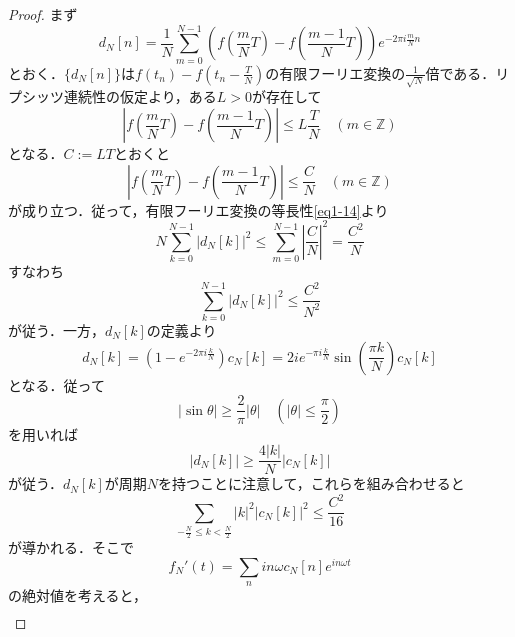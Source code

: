 \documentclass[a4j]{jsbook}
\numberwithin{theorem}{chapter}  %
\begin{document}
\begin{proof}
まず
\begin{equation*}
    d_N[n]=\frac{1}{N}\sum_{m=0}^{N-1}\left(f\left(\frac{m}{N}T\right)-f\left(\frac{m-1}{N}T\right)\right)e^{-2\pi i\frac{m}{N}n}
\end{equation*}
とおく．\(\{d_N[n]\}\)は\(\displaystyle f(t_n)-f\left(t_n-\frac{T}{N}\right)\)の有限フーリエ変換の\(\displaystyle\frac{1}{\sqrt{N}}\)倍である．リプシッツ連続性の仮定より，ある\(L>0\)が存在して
\begin{equation*}
    \left|f\left(\frac{m}{N}T\right)-f\left(\frac{m-1}{N}T\right)\right|\leq L\frac{T}{N}\quad (m\in\mathbb{Z})
\end{equation*}
となる．\(C:=LT\)とおくと
\begin{equation*}
    \left|f\left(\frac{m}{N}T\right)-f\left(\frac{m-1}{N}T\right)\right|\leq \frac{C}{N}\quad (m\in\mathbb{Z})
\end{equation*}
が成り立つ．従って，有限フーリエ変換の等長性\eqref{eq1-14}より
\begin{equation*}
    N\sum_{k=0}^{N-1}\left|d_N[k]\right|^2\leq\sum_{m=0}^{N-1}\left|\frac{C}{N}\right|^2=\frac{C^2}{N}
\end{equation*}
すなわち
\begin{equation*}
    \sum_{k=0}^{N-1}\left|d_N[k]\right|^2\leq\frac{C^2}{N^2}
\end{equation*}
が従う．一方，\(d_N[k]\)の定義より
\begin{equation*}
    d_N[k]=\left(1-e^{-2\pi i\frac{k}{N}}\right)c_N[k]=2ie^{-\pi i\frac{k}{N}}\sin\left(\frac{\pi k}{N}\right)c_N[k]
\end{equation*}
となる．従って
\begin{equation}
    |\sin\theta|\geq\frac{2}{\pi}|\theta|\quad \left(|\theta|\leq\frac{\pi}{2}\right) \label{eq1-16}
\end{equation}
を用いれば
\begin{equation*}
    \left|d_N[k]\right|\geq\frac{4|k|}{N}\left|c_N[k]\right|
\end{equation*}
が従う．\(d_N[k]\)が周期\(N\)を持つことに注意して，これらを組み合わせると
\begin{equation*}
    \sum_{-\frac{N}{2}\leq k<\frac{N}{2}}|k|^2|c_N[k]|^2\leq\frac{C^2}{16}
\end{equation*}
が導かれる．そこで
\begin{equation*}
    f_N'(t)=\sum_{n}in\omega c_N[n]e^{in\omega t}
\end{equation*}
の絶対値を考えると，
\begin{eqnarray}

\end{eqnarray}
\end{proof}
\end{document}
